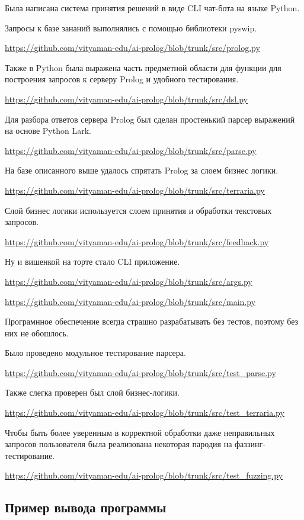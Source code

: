 \documentclass{article}
\begin{document}
Была написана система принятия решений в виде CLI чат-бота на
языке Python.

Запросы к базе зананий выполнялись с помощью библиотеки pyswip.

\url{https://github.com/vityaman-edu/ai-prolog/blob/trunk/src/prolog.py}

Также в Python была выражена часть предметной области для
функции для построения запросов к серверу Prolog и
удобного тестирования.

\url{https://github.com/vityaman-edu/ai-prolog/blob/trunk/src/dsl.py}

Для разбора ответов сервера Prolog был сделан простенький
парсер выражений на основе Python Lark.

\url{https://github.com/vityaman-edu/ai-prolog/blob/trunk/src/parse.py}

На базе описанного выше удалось спрятать Prolog за слоем
бизнес логики.

\url{https://github.com/vityaman-edu/ai-prolog/blob/trunk/src/terraria.py}

Слой бизнес логики используется слоем принятия и обработки
текстовых запросов.

\url{https://github.com/vityaman-edu/ai-prolog/blob/trunk/src/feedback.py}

Ну и вишенкой на торте стало CLI приложение.

\url{https://github.com/vityaman-edu/ai-prolog/blob/trunk/src/args.py}

\url{https://github.com/vityaman-edu/ai-prolog/blob/trunk/src/main.py}

Програмнное обеспечение всегда страшно разрабатывать без тестов,
поэтому без них не обошлось.

Было проведено модульное тестирование парсера.

\url{https://github.com/vityaman-edu/ai-prolog/blob/trunk/src/test_parse.py}

Также слегка проверен был слой бизнес-логики.

\url{https://github.com/vityaman-edu/ai-prolog/blob/trunk/src/test_terraria.py}

Чтобы быть более уверенным в корректной обработки
даже неправильных запросов пользователя была реализована
некоторая пародия на фаззинг-тестирование.

\url{https://github.com/vityaman-edu/ai-prolog/blob/trunk/src/test_fuzzing.py}

\subsection{Пример вывода программы}
\end{document}
